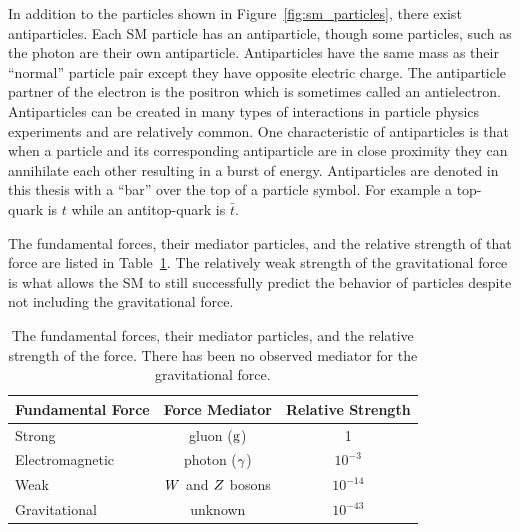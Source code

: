 In addition to the particles shown in Figure~\ref{fig:sm_particles}, there exist antiparticles.
Each SM particle has an antiparticle, though some particles, such as the photon
are their own antiparticle. Antiparticles have the same mass as their
``normal'' particle pair except they have opposite electric charge. The antiparticle
partner of the electron is the positron which is sometimes called an antielectron.
Antiparticles can be created in many types of interactions in particle physics experiments
and are relatively common. One characteristic of antiparticles is that when a particle and its 
corresponding antiparticle are in close proximity they can annihilate each other resulting in
a burst of energy.
Antiparticles are denoted in this thesis with a ``bar'' over the top of a particle symbol. For example
a top-quark is $t$ while an antitop-quark is $\bar{t}$.

The fundamental forces, their mediator particles, and the relative strength of that force
are listed in Table~\ref{tab:sm_forces}. The relatively weak strength of the gravitational
force is what allows the SM to still successfully predict the behavior
of particles despite not including the gravitational force.

\begin{table}[htbp]
\centering
\begin{tabular}{lcc}
Fundamental Force        &    Force Mediator             & Relative Strength   \\
\hline
Strong                   &    gluon ($\text{g}$)              &   1                 \\ 
Electromagnetic          &    photon ($\gamma$)            &   $10^{-3}$         \\ 
Weak                     &    $W$ and $Z$ bosons     &   $10^{-14}$        \\ 
Gravitational            &    unknown                    &   $10^{-43}$        \\ 
\hline
\end{tabular}
\caption{
The fundamental forces, their mediator particles, and the relative strength of the force.
There has been no observed mediator for the gravitational force.
}
\label{tab:sm_forces}
\end{table}

